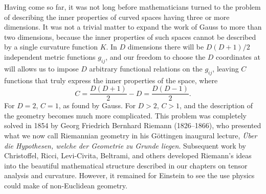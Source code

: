 Having come so far, it was not long before mathematicians turned to the
problem of describing the inner properties of curved spaces having three or
more dimensions. It was not a trivial matter to expand the work of Gauss to
more than two dimensions, because the inner properties of such spaces cannot
be described by a single curvature function \(K\). In \(D\) dimensions there
will be \(D(D+1)/2\) independent metric functions \(g_{ij}\), and our freedom
to choose the \(D\) coordinates at will allows us to impose \(D\) arbitrary
functional relations on the \(g_{ij}\), leaving \(C\) functions that truly
express the inner properties of the space, where
\[
  C=\frac{D(D+1)}{2}-D=\frac{D(D-1)}{2}.
\]
For \(D=2\), \(C=1\), as found by Gauss. For \(D>2\), \(C>1\), and the
description of the geometry becomes much more complicated. This problem was
completely solved in 1854 by Georg Friedrich Bernhard Riemann (1826--1866),
who presented what we now call Riemannian geometry in his G\"ottingen
inaugural lecture, \emph{\"Uber die Hypothesen, welche der Geometrie zu Grunde
liegen}. Subsequent work by Christoffel, Ricci, Levi-Civita, Beltrami, and
others developed Riemann's ideas into the beautiful mathematical structure
described in our chapters on tensor analysis and curvature. However, it
remained for Einstein to see the use physics could make of non-Euclidean
geometry.
